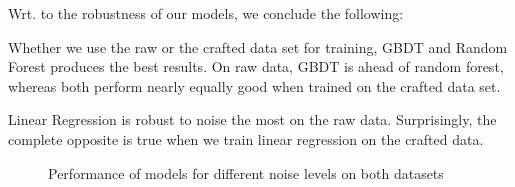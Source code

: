 Wrt. to the robustness of our models, we conclude the following:
\begin{description}[font=$\bullet$\scshape\bfseries]
	\item Whether we use the raw or the crafted data set for training, GBDT and Random Forest produces the best results. On raw data, GBDT is ahead of random forest, whereas both perform nearly equally good when trained on the crafted data set. 
	\item Linear Regression is robust to noise the most on the raw data. Surprisingly, the complete opposite is true when we train linear regression on the crafted data. 
\end{description}
\begin{figure}[h]
	\centering
	\caption{Performance of models for different noise levels on both datasets}
	\label{fig:noise}
\end{figure}



